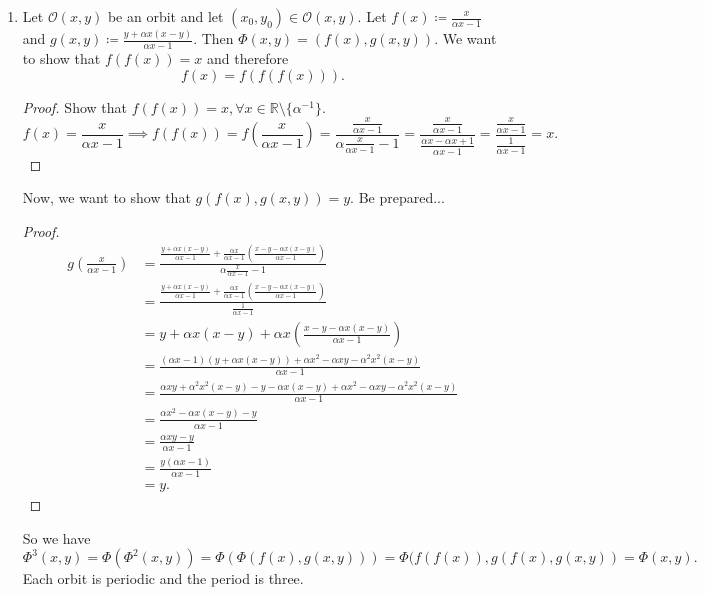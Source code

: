 \documentclass{article}
\theoremstyle{named}
\begin{document}
\begin{enumerate}[label=(\roman*)]
	\item Let $\mathcal O(x,y)$ be an orbit and let $(x_0,y_0) \in \mathcal O(x,y)$. Let $f(x) \coloneqq \frac{x}{\alpha x-1}$ and $g(x,y) \coloneqq \frac{y+\alpha x(x-y)}{\alpha x -1}$. Then $\Phi(x,y) = (f(x), g(x,y))$. We want to show that $f(f(x)) = x$ and therefore
	\[
		f(x) = f(f(f(x))).
	\]
	\begin{proof} Show that $f(f(x)) = x, \forall x \in \mathbb R \setminus \{ \alpha^{-1} \}$.
		\[
				f(x) = \frac{x}{\alpha x-1} \implies f(f(x)) = f(\frac{x}{\alpha x-1}) = \frac{\frac{x}{\alpha x-1}}{\alpha \frac{x}{\alpha x -1} - 1} = \frac{\frac{x}{\alpha x-1}}{ \frac{\alpha x - \alpha x + 1}{\alpha x -1} } = \frac{\frac{x}{\alpha x-1}}{ \frac{1}{\alpha x -1} }  =  x.
		\]
 	\end{proof}
 	Now, we want to show that $g(f(x), g(x,y)) = y$. Be prepared...
 	\begin{proof}
 		\begin{align*}
 			g(\frac{x}{\alpha x -1}) &= \frac{\frac{y+\alpha x (x-y)}{\alpha x -1} + \frac{\alpha x}{\alpha x -1}(\frac{x-y-\alpha x (x-y)}{\alpha x -1})}{\alpha \frac{x}{\alpha x -1} - 1}\\
 			 &= \frac{\frac{y+\alpha x (x-y)}{\alpha x -1} + \frac{\alpha x}{\alpha x -1}(\frac{x-y-\alpha x (x-y)}{\alpha x -1})}{\frac{1}{\alpha x -1}} \\
 			&= y + \alpha x (x-y) + \alpha x (\frac{x-y-\alpha x (x-y)}{\alpha x-1}) \\
 			&= \frac{(\alpha x -1)(y + \alpha x (x-y)) + \alpha x^2- \alpha xy - \alpha^2x^2(x-y)}{\alpha x-1} \\
 			&= \frac{\alpha xy + \alpha^2x^2(x-y) -y - \alpha x(x-y) + \alpha x^2- \alpha xy - \alpha^2x^2(x-y)}{\alpha x-1} \\ 
 			&= \frac{\alpha x^2 - \alpha x (x-y) -y}{\alpha x -1} \\
 			&= \frac{\alpha xy -y }{\alpha x -1} \\
 			&= \frac{y (\alpha x-1)}{\alpha x -1}\\
 			&= y.
 		\end{align*}
 	\end{proof}
 	So we have 
 	\[
 		\Phi^3(x,y) = \Phi(\Phi^2(x,y)) = \Phi(\Phi(f(x), g(x,y))) = \Phi(f(f(x)), g(f(x), g(x,y)) =  \Phi(x,y).
 	\]
 	Each orbit is periodic and the period is three.
 	

\end{enumerate}
\end{document}
